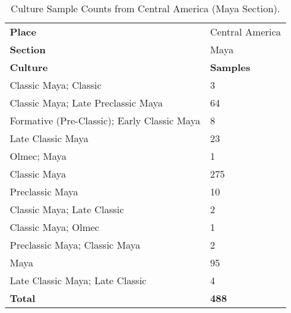 \documentclass[11pt]{article}
\begin{document}
\begin{table}[ht]
    \centering
    \small
    \begin{tabularx}{\columnwidth}{Xl}
        \hline
        \rowcolor{brown!30} \textbf{Place} & Central America \\
        \rowcolor{brown!20} \textbf{Section} & Maya \\
        \hline
        \rowcolor{brown!10} \textbf{Culture} & \textbf{Samples} \\
        \hline
        Classic Maya; Classic & 3 \\
        Classic Maya; Late Preclassic Maya & 64 \\
        Formative (Pre-Classic); Early Classic Maya & 8 \\
        Late Classic Maya & 23 \\
        Olmec; Maya & 1 \\
        Classic Maya & 275 \\
        Preclassic Maya & 10 \\
        Classic Maya; Late Classic & 2 \\
        Classic Maya; Olmec & 1 \\
        Preclassic Maya; Classic Maya & 2 \\
        Maya & 95 \\
        Late Classic Maya; Late Classic & 4 \\
        \hline
        \rowcolor{brown!10}\textbf{Total} & \textbf{488} \\
        \hline
    \end{tabularx}
    \caption{Culture Sample Counts from Central America (Maya Section).}
    \label{tab:culture-sample-maya}
\end{table}
\end{document}
